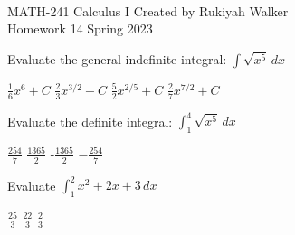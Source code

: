 \documentclass[addpoints, 12pt]{exam}%
\newcommand{\spc}{\vspace*{0.5cm}}
\begin{document}
\noindent \hrulefill \\
	MATH-241 Calculus I \hfill Created by Rukiyah Walker\\
	Homework 14 \hfill Spring 2023\\ \vspace*{-1cm}
 
	\noindent\hrulefill


\begin{questions}

\vspace*{0.5cm}

\question[1]

Evaluate the general indefinite integral:
$\displaystyle \int \sqrt{x^5} \,dx$

\begin{multicols}{2}
\begin{choices}
\choice $\frac{1}{6}x^6 + C$
\choice $\frac{2}{3}x^{3/2} + C$
\choice $\frac{5}{2}x^{2/5} + C$
\CorrectChoice $\frac{2}{7}x^{7/2} + C$
\end{choices}
\end{multicols}

\spc

\question[1]

Evaluate the definite integral: 
$\displaystyle\int_{1}^{4} \sqrt{x^5} \,dx$

\begin{multicols}{2}
\begin{choices}
\CorrectChoice $\frac{254}{7}$
\choice $\frac{1365}{2}$
\choice -$\frac{1365}{2}$
\choice $-\frac{254}{7}$
\end{choices}
\end{multicols}

\spc

\question[1]

Evaluate $\displaystyle\int_{1}^{2} x^2 + 2x +3\,dx$

\begin{multicols}{2}
\begin{choices}
\CorrectChoice $\frac{25}{3}$
\choice $\frac{22}{3}$
\choice $\frac{2}{3}$
\end{choices}
\end{multicols}


\end{questions}
\end{document}
